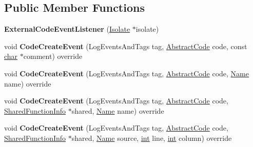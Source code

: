 \subsection*{Public Member Functions}
\begin{DoxyCompactItemize}
\item 
\mbox{\label{classv8_1_1internal_1_1ExternalCodeEventListener_a488fd03dc934b0104ac4bb9e1fcc9782}} 
{\bfseries External\+Code\+Event\+Listener} (\mbox{\hyperlink{classv8_1_1internal_1_1Isolate}{Isolate}} $\ast$isolate)
\item 
\mbox{\label{classv8_1_1internal_1_1ExternalCodeEventListener_ab237aa582f39ce444db94a7291809049}} 
void {\bfseries Code\+Create\+Event} (Log\+Events\+And\+Tags tag, \mbox{\hyperlink{classv8_1_1internal_1_1AbstractCode}{Abstract\+Code}} code, const \mbox{\hyperlink{classchar}{char}} $\ast$comment) override
\item 
\mbox{\label{classv8_1_1internal_1_1ExternalCodeEventListener_a99cf1dbbd1cb3ed73d487d47dbf9b89a}} 
void {\bfseries Code\+Create\+Event} (Log\+Events\+And\+Tags tag, \mbox{\hyperlink{classv8_1_1internal_1_1AbstractCode}{Abstract\+Code}} code, \mbox{\hyperlink{classv8_1_1internal_1_1Name}{Name}} name) override
\item 
\mbox{\label{classv8_1_1internal_1_1ExternalCodeEventListener_ada28e41fe92e55a0403219ba0b1ee885}} 
void {\bfseries Code\+Create\+Event} (Log\+Events\+And\+Tags tag, \mbox{\hyperlink{classv8_1_1internal_1_1AbstractCode}{Abstract\+Code}} code, \mbox{\hyperlink{classv8_1_1internal_1_1SharedFunctionInfo}{Shared\+Function\+Info}} $\ast$shared, \mbox{\hyperlink{classv8_1_1internal_1_1Name}{Name}} name) override
\item 
\mbox{\label{classv8_1_1internal_1_1ExternalCodeEventListener_a58a393a15ae44a9b7856ffeb54f646df}} 
void {\bfseries Code\+Create\+Event} (Log\+Events\+And\+Tags tag, \mbox{\hyperlink{classv8_1_1internal_1_1AbstractCode}{Abstract\+Code}} code, \mbox{\hyperlink{classv8_1_1internal_1_1SharedFunctionInfo}{Shared\+Function\+Info}} $\ast$shared, \mbox{\hyperlink{classv8_1_1internal_1_1Name}{Name}} source, \mbox{\hyperlink{classint}{int}} line, \mbox{\hyperlink{classint}{int}} column) override

\end{DoxyCompactItemize}
